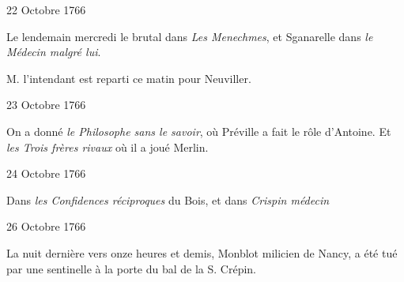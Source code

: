                      \begin{diary}{22 Octobre 1766}{}
                        
                         Le lendemain mercredi le brutal dans
                           \emph{Les Menechmes}, et Sganarelle dans \emph{le Médecin
                              malgré lui}. \bigskip
        
        
                        
                           M. l’intendant est reparti ce
                           matin pour
                           Neuviller. \bigskip
        
        
                     \end{diary}

                     \begin{diary}{23 Octobre 1766}{}
                        
                         On a donné \emph{le
                              Philosophe sans le savoir},
                           où Préville a fait le rôle d’Antoine. Et
                           \emph{les Trois frères rivaux} où il a joué
                           Merlin. \bigskip
        
        
                     \end{diary}

                     \begin{diary}{24 Octobre 1766}{}
                        
                         Dans \emph{les
                              Confidences réciproques}
                           du Bois, et dans
                           \emph{Crispin médecin}
                        \bigskip
        
        
                     \end{diary}

                     \begin{diary}{26 Octobre 1766}{}
                        
                         La nuit dernière vers onze heures
                           et demis,
                           Monblot milicien de Nancy, a été tué
                           par une sentinelle à la
                           porte du bal de la
                           S. Crépin. \bigskip
        
        
                     \end{diary}

